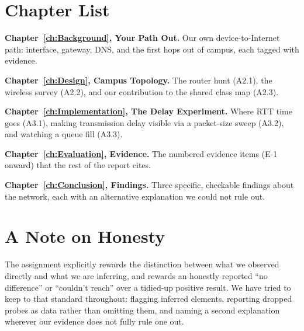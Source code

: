 \section{Chapter List}
\textbf{Chapter~\ref{ch:Background}, Your Path Out.} Our own device-to-Internet path: interface,
gateway, DNS, and the first hops out of campus, each tagged with evidence.

\textbf{Chapter~\ref{ch:Design}, Campus Topology.} The router hunt (A2.1), the wireless survey
(A2.2), and our contribution to the shared class map (A2.3).

\textbf{Chapter~\ref{ch:Implementation}, The Delay Experiment.} Where RTT time goes (A3.1),
making transmission delay visible via a packet-size sweep (A3.2), and watching a queue fill
(A3.3).

\textbf{Chapter~\ref{ch:Evaluation}, Evidence.} The numbered evidence items (E-1 onward)
that the rest of the report cites.

\textbf{Chapter~\ref{ch:Conclusion}, Findings.} Three specific, checkable findings about the
network, each with an alternative explanation we could not rule out.

\section{A Note on Honesty}
The assignment explicitly rewards the distinction between what we observed directly and what
we are inferring, and rewards an honestly reported ``no difference'' or ``couldn't reach'' over a
tidied-up positive result. We have tried to keep to that standard throughout: flagging
inferred elements, reporting dropped probes as data rather than omitting them, and naming a
second explanation wherever our evidence does not fully rule one out.
